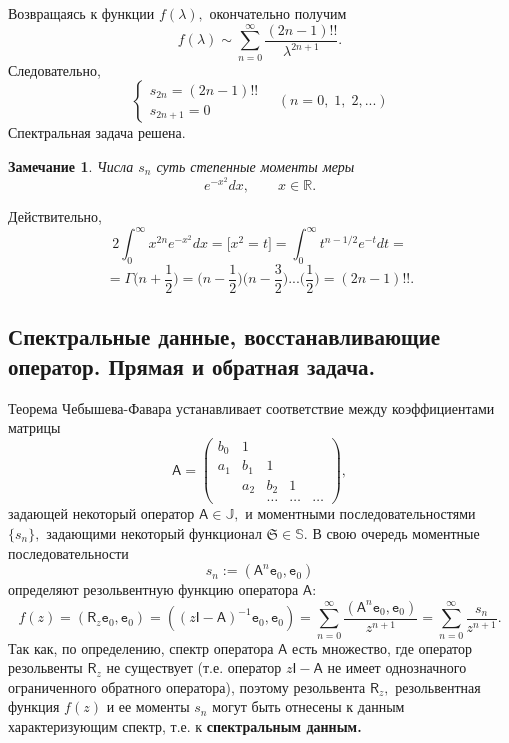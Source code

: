 \documentclass[12 pt, a4 paper]{article}
\theoremstyle{plain}   \newtheorem{Pro}{Задача}
\newtheorem{Rem}{Замечание}
\begin{document}
Возвращаясь к функции
$ f(\lambda ) , $
окончательно получим
$$
  f(\lambda ) \sim \sum _{n=0}^{\infty}
  \frac{(2n-1)!!}{\lambda ^{2n+1}}.
$$
Следовательно,
$$
  \begin{cases}
    s_{2n}=(2n-1)!! \\
	s_{2n+1}=0
  \end{cases}
  \quad (n=0, \; 1, \; 2,...)
$$
Спектральная задача решена.
\begin{Rem}
Числа
$ s_n $
суть степенные моменты меры
$$
  e^{-x^2}dx, \qquad x \in \mathbb{R}.
$$
\end{Rem}
Действительно,
$$
  2 \int _0 ^{\infty} x^{2n}e^{-x^2}dx=
  \biggl [ x^2 =t \biggr ] =
  \int _0 ^{\infty} t^{n-1/2}e^{-t}dt=
$$
$$
  =\Gamma \biggl ( n+\frac{1}{2} \biggr )=
  \biggl (n-\frac{1}{2} \biggr )
  \biggl (n-\frac{3}{2} \biggr )...
  \biggl ( \frac{1}{2} \biggr ) =
  (2n-1)!! .
$$
\newpage
\subsection{Спектральные данные, восстанавливающие \\
оператор.
Прямая и обратная задача.}
$$ \; $$
Теорема Чебышева-Фавара устанавливает соответствие между
коэффициентами матрицы
\begin{equation*}
  \mathsf{A}=
    \begin{pmatrix}
	  b_0 & 1 & \; & \; & \; \\
	  a_1 & b_1 & 1 & \; & \; \\
	  \; & a_2 & b_2 & 1 & \; \\
	  \; & \; & \dots & \dots & \dots
	\end{pmatrix},
\end{equation*}
задающей некоторый оператор
$ \mathsf{A} \in \mathbb{J} , $
и моментными последовательностями
$ \{ s_n \} , $
задающими некоторый функционал
$ \mathfrak{S} \in \mathbb{S}. $
В свою очередь моментные последовательности
$$
  s_n := ( \mathsf{A}^n \mathtt{e}_0 , \mathtt{e}_0 )
$$
определяют резольвентную функцию оператора
$ \mathsf{A}: $
$$
  f(z)=(\mathsf{R}_z \mathtt{e}_0 , \mathtt{e}_0 )=
    ((z \mathsf{I}-\mathsf{A})^{-1} \mathtt{e}_0 , \mathtt{e}_0 )=
	  \sum _{n=0}^{\infty}\frac
	    {(\mathsf{A}^n \mathtt{e}_0 , \mathtt{e}_0 )}
		  {z^{n+1}}=
		    \sum _{n=0}^{\infty}
			  \frac{s_n}{z^{n+1}}.
$$
Так как, по определению, спектр оператора
$ \mathsf{A} $
есть множество, где оператор резольвенты
$ \mathsf{R}_z $
не существует (т.е. оператор
$ z\mathsf{I}-\mathsf{A} $
не имеет однозначного ограниченного обратного оператора),
поэтому резольвента
$ \mathsf{R}_z , $
резольвентная функция
$ f(z)  $
и ее моменты
$ s_n $
могут быть отнесены к данным характеризующим спектр, т.е. к
{\bfseries спектральным данным.} \\
\end{document}
